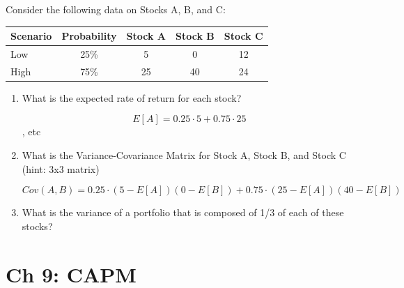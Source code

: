\documentclass[11pt]{article}
\theoremstyle{definition}
\begin{document}
        \begin{shaded}
        Consider the following data on Stocks A, B, and C:
    
            \begin{tabular}{lcccc}
            \toprule
            Scenario & Probability & Stock A & Stock B & Stock C\\
            \midrule
            Low & 25\% & 5 & 0 & 12 \\
            High &75\% & 25 & 40 & 24 \\
            \bottomrule
            \end{tabular}
    
        \begin{enumerate}
            \item	What is the expected rate of return for each stock?

            $$E[A] = 0.25\cdot5 + 0.75\cdot25$$, etc
            \item	What is the Variance-Covariance Matrix for Stock A, Stock B, and Stock C (hint: 3x3 matrix)

            $$Cov(A,B) = 0.25\cdot(5-E[A])(0-E[B]) + 0.75\cdot(25-E[A])(40-E[B])$$
            
            \item What is the variance of a portfolio that is composed of 1/3 of each of these stocks?
        \end{enumerate}
    \end{shaded}

\section{Ch 9: CAPM}
\end{document}
